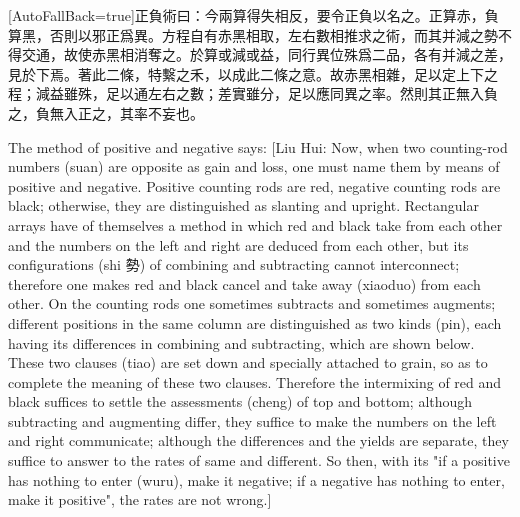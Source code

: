 \documentclass[11pt]{article}
\newcommand{\zhsmall}{\footnotesize\color{black!70}}
\newcommand{\unitlabel}[1]{\marginpar{\raggedleft\tiny\color{gray}#1}}
\newenvironment{unitzh}{\par\CJKfontspec{Noto Serif CJK SC}[AutoFallBack=true]\large\linespread{1.25}\selectfont}{\par}
\newenvironment{uniten}{\par\small\color{black!85}}{\par\medskip}
\begin{document}
\begin{unitzh}\unitlabel{jiuzhang-033.11}正負術曰：{\zhsmall 今兩算得失相反，要令正負以名之。正算赤，負算黑，否則以邪正爲異。方程自有赤黑相取，左右數相推求之術，而其并減之勢不得交通，故使赤黑相消奪之。於算或減或益，同行異位殊爲二品，各有并減之差，見於下焉。著此二條，特繫之禾，以成此二條之意。故赤黑相雜，足以定上下之程；減益雖殊，足以通左右之數；差實雖分，足以應同異之率。然則其正無入負之，負無入正之，其率不妄也。}\end{unitzh}
\begin{uniten}The method of positive and negative says: [Liu Hui: Now, when two counting-rod numbers (suan) are opposite as gain and loss, one must name them by means of positive and negative. Positive counting rods are red, negative counting rods are black; otherwise, they are distinguished as slanting and upright. Rectangular arrays have of themselves a method in which red and black take from each other and the numbers on the left and right are deduced from each other, but its configurations (shi 勢) of combining and subtracting cannot interconnect; therefore one makes red and black cancel and take away (xiaoduo) from each other. On the counting rods one sometimes subtracts and sometimes augments; different positions in the same column are distinguished as two kinds (pin), each having its differences in combining and subtracting, which are shown below. These two clauses (tiao) are set down and specially attached to grain, so as to complete the meaning of these two clauses. Therefore the intermixing of red and black suffices to settle the assessments (cheng) of top and bottom; although subtracting and augmenting differ, they suffice to make the numbers on the left and right communicate; although the differences and the yields are separate, they suffice to answer to the rates of same and different. So then, with its "if a positive has nothing to enter (wuru), make it negative; if a negative has nothing to enter, make it positive", the rates are not wrong.]\end{uniten}
\end{document}
